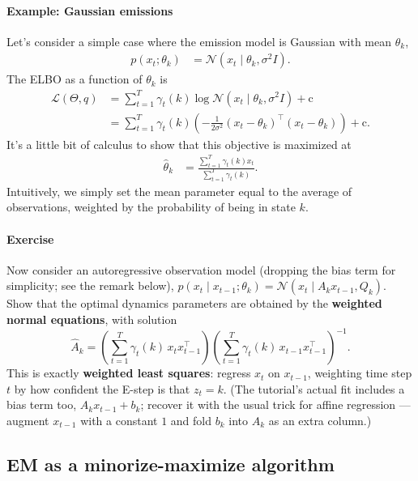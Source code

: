 \documentclass[11pt]{article}
\newcommand{\N}{\mathcal{N}}
\begin{document}
\paragraph{Example: Gaussian emissions}

Let's consider a simple case where the emission model is Gaussian with mean $\theta_k$,
\begin{align}
  p(x_t; \theta_k) &= \N(x_t \mid \theta_k, \sigma^2 I).
\end{align}
The ELBO as a function of $\theta_k$ is
\begin{align}
  \mathcal{L}(\Theta, q) &=
  \sum_{t=1}^T \gamma_t(k) \log \N(x_t \mid \theta_k, \sigma^2 I) + \mathrm{c} \\
  &= \sum_{t=1}^T \gamma_t(k) \left( -\frac{1}{2\sigma^2} (x_t - \theta_k)^\top (x_t - \theta_k)\right) + \mathrm{c}.
\end{align}
It's a little bit of calculus to show that this objective is maximized at
\begin{align}
  \hat\theta_k &= \frac{\sum_{t=1}^T \gamma_t(k) x_t}{\sum_{t=1}^T \gamma_t(k)}.
\end{align}
Intuitively, we simply set the mean parameter equal to the average of observations, weighted by the probability of being in state $k$.

\paragraph{Exercise}
Now consider an autoregressive observation model (dropping the bias term for simplicity; see the remark below), $p(x_t \mid x_{t-1}; \theta_k) = \N(x_t \mid A_k x_{t-1}, Q_k)$.
Show that the optimal dynamics parameters are obtained by the
\textbf{weighted normal equations}, with solution
\begin{equation}
\boxed{\hat A_k
= \left(\sum_{t=1}^T \gamma_t(k)\, x_t x_{t-1}^\top\right)
  \left(\sum_{t=1}^T \gamma_t(k)\, x_{t-1}x_{t-1}^\top\right)^{-1}.}
\label{eq:mstep-A}
\end{equation}
This is exactly \textbf{weighted least squares}: regress $x_t$ on
$x_{t-1}$, weighting time step $t$ by how confident the
E-step is that $z_t = k$. (The tutorial's actual fit includes a bias term
too, $A_kx_{t-1}+b_k$; recover it with the usual trick for affine
regression --- augment $x_{t-1}$ with a constant $1$ and fold $b_k$ into
$A_k$ as an extra column.)


\subsection{EM as a minorize-maximize algorithm}
\end{document}
